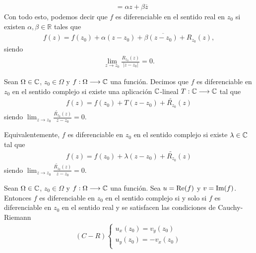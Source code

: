 \begin{obs}
\begin{align*}
                                & = \alpha z + \beta \overline{z}
    \end{align*}
    Con todo esto, podemos decir que $f$ es diferenciable en el sentido real en $z_0$ si existen $\alpha, \beta \in \mathbb{R}$ tales que
    \begin{align*}
        f(z) = f(z_0) + \alpha (z-z_0) + \beta \overline{(z - z_0)} + R_{z_0}(z),
    \end{align*}
    siendo
    \begin{align*}
        \lim_{z \to z_0}{\frac{R_{z_0}(z)}{|z-z_0|} = 0}.
    \end{align*}
\end{obs}

\begin{defi}
    Sean $\Omega \in \mathbb{C}$, $z_0 \in \Omega$ y $f : \Omega \longrightarrow \mathbb{C}$ una función. Decimos que $f$ es diferenciable en $z_0$ en el sentido complejo si existe una aplicación $\mathbb{C}$-lineal $T : \mathbb{C} \longrightarrow \mathbb{C}$ tal que
    \begin{align*}
        f(z) = f(z_0) + T(z - z_0) +\widetilde{R_{z_0}}(z)
    \end{align*}
    siendo $\lim_{z \to z_0}{\frac{\widetilde{R_{z_0}}(z)}{z - z_0} = 0}$.
\end{defi}
Equivalentemente, $f$ es diferenciable en $z_0$ en el sentido complejo si existe $\lambda \in \mathbb{C}$ tal que
\begin{align*}
    f(z) = f(z_0) + \lambda (z - z_0) + \widetilde{R_{z_0}}(z)
\end{align*}
siendo $\lim_{z \to z_0}{\frac{\widetilde{R_{z_0}}(z)}{z - z_0} = 0}$.

\begin{prop}
    Sean $\Omega \in \mathbb{C}$, $z_0 \in \Omega$ y $f : \Omega \longrightarrow \mathbb{C}$ una función. Sea $u = \text{Re}(f)$ y $v = \text{Im}(f)$. Entonces $f$ es diferenciable en $z_0$ en el sentido complejo si y solo si $f$ es diferenciable en $z_0$ en el sentido real y se satisfacen las condiciones de Cauchy-Riemann
    \begin{align*}
        (C-R) \left\{ \begin{array}{lcc}
                          u_x(z_0) = v_y(z_0)  \\
                          u_y(z_0) = -v_x(z_0) \\
                      \end{array}
        \right.
    \end{align*}
\end{prop}


